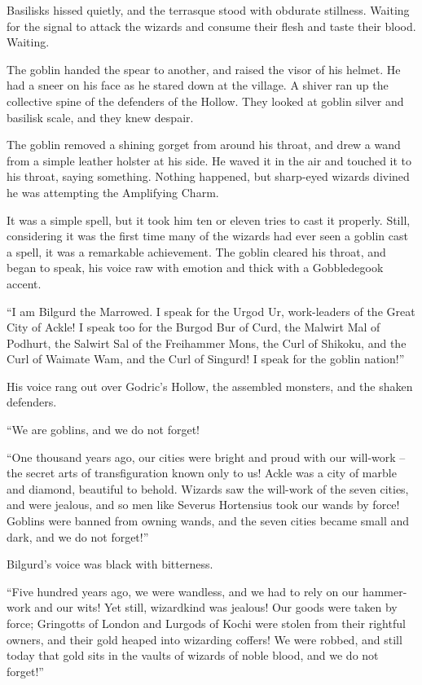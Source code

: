 Basilisks hissed quietly, and the terrasque stood with obdurate
stillness. Waiting for the signal to attack the wizards and consume
their flesh and taste their blood. Waiting.

The goblin handed the spear to another, and raised the visor of his
helmet. He had a sneer on his face as he stared down at the village. A
shiver ran up the collective spine of the defenders of the Hollow. They
looked at goblin silver and basilisk scale, and they knew despair.

The goblin removed a shining gorget from around his throat, and drew a
wand from a simple leather holster at his side. He waved it in the air
and touched it to his throat, saying something. Nothing happened, but
sharp-eyed wizards divined he was attempting the Amplifying Charm.

It was a simple spell, but it took him ten or eleven tries to cast it
properly. Still, considering it was the first time many of the wizards
had ever seen a goblin cast a spell, it was a remarkable achievement.
The goblin cleared his throat, and began to speak, his voice raw with
emotion and thick with a Gobbledegook accent.

``I am Bilgurd the Marrowed. I speak for the Urgod Ur, work-leaders of
the Great City of Ackle! I speak too for the Burgod Bur of Curd, the
Malwirt Mal of Podhurt, the Salwirt Sal of the Freihammer Mons, the Curl
of Shikoku, and the Curl of Waimate Wam, and the Curl of Singurd! I
speak for the goblin nation!''

His voice rang out over Godric's Hollow, the assembled monsters, and the
shaken defenders.

``We are goblins, and we do not forget!

``One thousand years ago, our cities were bright and proud with our
will-work -- the secret arts of transfiguration known only to us! Ackle
was a city of marble and diamond, beautiful to behold. Wizards saw the
will-work of the seven cities, and were jealous, and so men like Severus
Hortensius took our wands by force! Goblins were banned from owning
wands, and the seven cities became small and dark, and we do not
forget!''

Bilgurd's voice was black with bitterness.

``Five hundred years ago, we were wandless, and we had to rely on our
hammer-work and our wits! Yet still, wizardkind was jealous! Our goods
were taken by force; Gringotts of London and Lurgods of Kochi were
stolen from their rightful owners, and their gold heaped into wizarding
coffers! We were robbed, and still today that gold sits in the vaults of
wizards of noble blood, and we do not forget!''

